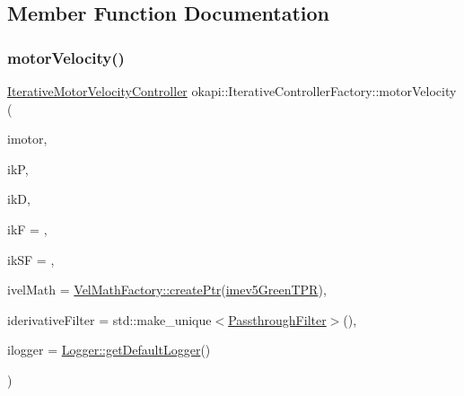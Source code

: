 \subsection{Member Function Documentation}
\mbox{\label{classokapi_1_1IterativeControllerFactory_a55d93373ed17166b0f5747a76690d1de}} 
\subsubsection{\texorpdfstring{motorVelocity()}{motorVelocity()}\hspace{0.1cm}{\footnotesize\ttfamily [1/4]}}
{\footnotesize\ttfamily \mbox{\hyperlink{classokapi_1_1IterativeMotorVelocityController}{Iterative\+Motor\+Velocity\+Controller}} okapi\+::\+Iterative\+Controller\+Factory\+::motor\+Velocity (\begin{DoxyParamCaption}\item[{\mbox{\hyperlink{classokapi_1_1Motor}{Motor}}}]{imotor,  }\item[{double}]{ikP,  }\item[{double}]{ikD,  }\item[{double}]{ikF = {},  }\item[{double}]{ik\+SF = {},  }\item[{std\+::unique\+\_\+ptr$<$ \mbox{\hyperlink{classokapi_1_1VelMath}{Vel\+Math}} $>$}]{ivel\+Math = {\ttfamily \mbox{\hyperlink{classokapi_1_1VelMathFactory_a26b75e227e114812131c64d17015948f}{Vel\+Math\+Factory\+::create\+Ptr}}(\mbox{\hyperlink{namespaceokapi_a5263bab3bfecd482a573b6d04fb584ac}{imev5\+Green\+T\+PR}})},  }\item[{std\+::unique\+\_\+ptr$<$ \mbox{\hyperlink{classokapi_1_1Filter}{Filter}} $>$}]{iderivative\+Filter = {\ttfamily std\+:\+:make\+\_\+unique$<$\mbox{\hyperlink{classokapi_1_1PassthroughFilter}{Passthrough\+Filter}}$>$()},  }\item[{const std\+::shared\+\_\+ptr$<$ \mbox{\hyperlink{classokapi_1_1Logger}{Logger}} $>$ \&}]{ilogger = {\ttfamily \mbox{\hyperlink{classokapi_1_1Logger_a5053cf778b4b55acba788a3797dc96d2}{Logger\+::get\+Default\+Logger}}()} }\end{DoxyParamCaption})\hspace{0.3cm}{\ttfamily [static]}}

